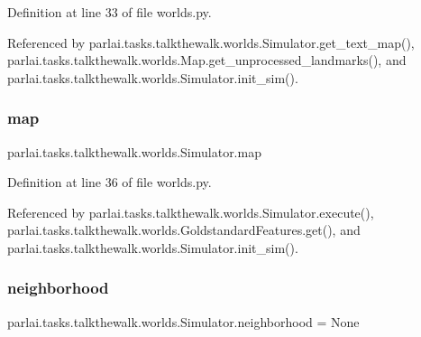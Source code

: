 Definition at line 33 of file worlds.\+py.



Referenced by parlai.\+tasks.\+talkthewalk.\+worlds.\+Simulator.\+get\+\_\+text\+\_\+map(), parlai.\+tasks.\+talkthewalk.\+worlds.\+Map.\+get\+\_\+unprocessed\+\_\+landmarks(), and parlai.\+tasks.\+talkthewalk.\+worlds.\+Simulator.\+init\+\_\+sim().

\mbox{\label{classparlai_1_1tasks_1_1talkthewalk_1_1worlds_1_1Simulator_a2e496f42b19dac1ad35d9604f63dd8e0}} 
\subsubsection{\texorpdfstring{map}{map}}
{\footnotesize\ttfamily parlai.\+tasks.\+talkthewalk.\+worlds.\+Simulator.\+map}



Definition at line 36 of file worlds.\+py.



Referenced by parlai.\+tasks.\+talkthewalk.\+worlds.\+Simulator.\+execute(), parlai.\+tasks.\+talkthewalk.\+worlds.\+Goldstandard\+Features.\+get(), and parlai.\+tasks.\+talkthewalk.\+worlds.\+Simulator.\+init\+\_\+sim().

\mbox{\label{classparlai_1_1tasks_1_1talkthewalk_1_1worlds_1_1Simulator_a79e2dd5fa3d217ff8e909ef731e38314}} 
\subsubsection{\texorpdfstring{neighborhood}{neighborhood}}
{\footnotesize\ttfamily parlai.\+tasks.\+talkthewalk.\+worlds.\+Simulator.\+neighborhood = None\hspace{0.3cm}{\ttfamily [static]}}



